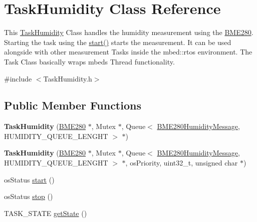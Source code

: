 \hypertarget{class_task_humidity}{}\section{Task\+Humidity Class Reference}
\label{class_task_humidity}


This \hyperlink{class_task_humidity}{Task\+Humidity} Class handles the humidity measurement using the \hyperlink{class_b_m_e280}{B\+M\+E280}. Starting the task using the \hyperlink{class_task_humidity_a2a3f5cee6c4794901c5b95a28df7388b}{start()} starts the measurement. It can be used alongside with other measurement Tasks inside the mbed\+::rtos environment. The Task Class basically wraps mbeds Thread functionality.  




{\ttfamily \#include $<$Task\+Humidity.\+h$>$}

\subsection*{Public Member Functions}
\begin{DoxyCompactItemize}
\item 
\hypertarget{class_task_humidity_a545407db5ef85639236f35620b5bb114}{}{\bfseries Task\+Humidity} (\hyperlink{class_b_m_e280}{B\+M\+E280} $\ast$, Mutex $\ast$, Queue$<$ \hyperlink{class_b_m_e280_humidity_message}{B\+M\+E280\+Humidity\+Message}, H\+U\+M\+I\+D\+I\+T\+Y\+\_\+\+Q\+U\+E\+U\+E\+\_\+\+L\+E\+N\+G\+H\+T $>$ $\ast$)\label{class_task_humidity_a545407db5ef85639236f35620b5bb114}

\item 
\hypertarget{class_task_humidity_ae8c19f103089b840ca43ddf9e3545b6f}{}{\bfseries Task\+Humidity} (\hyperlink{class_b_m_e280}{B\+M\+E280} $\ast$, Mutex $\ast$, Queue$<$ \hyperlink{class_b_m_e280_humidity_message}{B\+M\+E280\+Humidity\+Message}, H\+U\+M\+I\+D\+I\+T\+Y\+\_\+\+Q\+U\+E\+U\+E\+\_\+\+L\+E\+N\+G\+H\+T $>$ $\ast$, os\+Priority, uint32\+\_\+t, unsigned char $\ast$)\label{class_task_humidity_ae8c19f103089b840ca43ddf9e3545b6f}

\item 
os\+Status \hyperlink{class_task_humidity_a2a3f5cee6c4794901c5b95a28df7388b}{start} ()
\item 
os\+Status \hyperlink{class_task_humidity_a2fa68058ef5a7c52019e16c648738a41}{stop} ()
\item 
T\+A\+S\+K\+\_\+\+S\+T\+A\+T\+E \hyperlink{class_task_humidity_a908679dd64690c5c4d801ce812a1e97c}{get\+State} ()
\end{DoxyCompactItemize}


